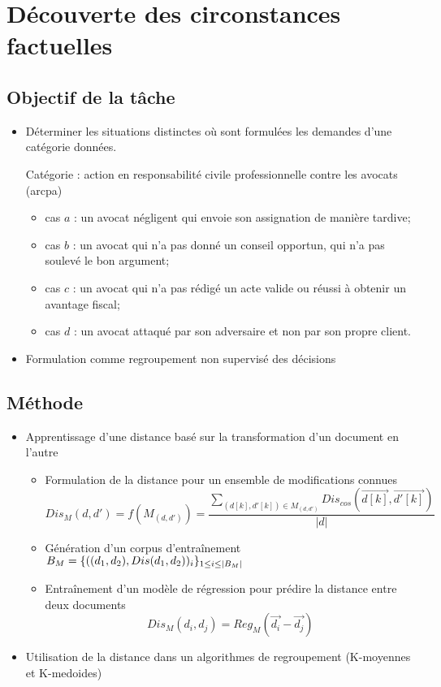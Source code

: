 \section{Découverte des circonstances factuelles}
\subsection{Objectif de la tâche}
\begin{frame}[t]{\mysubsectiontitle}
	
	\begin{itemize} \small
		\item Déterminer les situations distinctes où sont formulées les demandes d'une catégorie données.
		\begin{exampleblock}{\small Catégorie : action en responsabilité civile professionnelle contre les avocats (arcpa)}
			\begin{itemize}\scriptsize
				\item cas $a$ : un avocat négligent qui envoie son assignation de manière tardive; 
				\item cas $b$ : un avocat qui n'a pas donné un conseil opportun, qui n'a pas soulevé le bon argument;
				\item cas $c$ : un avocat qui n'a pas rédigé un acte valide ou réussi à obtenir un avantage fiscal; 
				\item cas $d$ : un avocat attaqué par son adversaire et non par son propre client.
			\end{itemize}
		\end{exampleblock}
		\item Formulation comme regroupement non supervisé des décisions
	\end{itemize}
\end{frame}
\subsection{Méthode}
\begin{frame}[t]{\mysubsectiontitle}
	\begin{itemize}%
		\item Apprentissage d'une distance basé sur la transformation d'un document en l'autre
	\begin{itemize} 
		\item Formulation de la distance pour un ensemble de modifications connues	
		\[{Dis_{M}}(d,d') = {f}({M}_{(d,d')}) = \frac{\sum\limits_{(d[k], d'[k]) \in {M}_{(d,d')}} Dis_{cos}(\overrightarrow{d[k]}, \overrightarrow{d'[k]})}{\vert d \vert}\] 
		\item Génération d'un corpus d'entraînement	$B_{M} = \lbrace ((d_1, d_2), {Dis}(d_1, d_2))_i\rbrace_{1 \leq i \leq {\vert B_{M}\vert}}$
		\item Entraînement d'un modèle de régression pour prédire la distance entre deux documents \[Dis_{M}(d_i, d_j) = Reg_{M}(\vec{d_{i}} - \vec{d_{j}})\]
	\end{itemize}
	\item Utilisation de la distance dans un algorithmes de regroupement (K-moyennes et K-medoides)
	\end{itemize}	
\end{frame}

